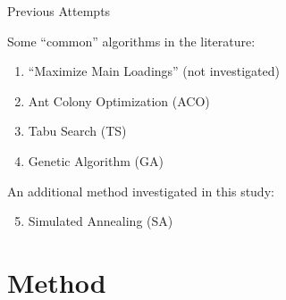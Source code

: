 \documentclass[ignorenonframetext,]{beamer}
\providecommand{\tightlist}{%
  \setlength{\itemsep}{0pt}\setlength{\parskip}{0pt}}
\begin{document}
\begin{frame}{Previous Attempts}
\protect\hypertarget{previous-attempts}{}

Some ``common'' algorithms in the literature:

\begin{enumerate}
\tightlist
\item
  ``Maximize Main Loadings'' (not investigated)
\item
  Ant Colony Optimization (ACO)
\item
  Tabu Search (TS)
\item
  Genetic Algorithm (GA)
\end{enumerate}

An additional method investigated in this study:

\begin{enumerate}
\setcounter{enumi}{4}
\tightlist
\item
  Simulated Annealing (SA)
\end{enumerate}

\end{frame}

\hypertarget{method}{%
\section{Method}\label{method}}
\end{document}
